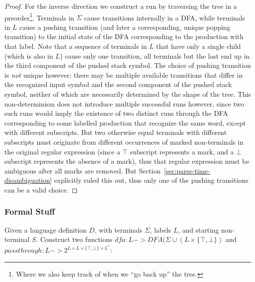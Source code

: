 \documentclass[acmsmall,review,anonymous]{acmart}\settopmatter{printfolios=true,printccs=false,printacmref=false}
\newcommand{\T}{\Sigma} %
\newcommand{\Labels}{L} %
\newcommand{\dfa}{\mathit{dfa}} %
\newcommand{\passthrough}{\mathit{passthrough}} %
\begin{document}
\begin{proof}
  For the inverse direction we construct a run by traversing the tree in a preorder\footnote{Where we also keep track of when we ``go back up'' the tree.}. Terminals in $\T$ cause transitions internally in a DFA, while terminals in $\Labels$ cause a pushing transition (and later a corresponding, unique popping transition) to the initial state of the DFA corresponding to the production with that label. Note that a sequence of terminals in $\Labels$ that have only a single child (which is also in $\Labels$) cause only one transition, all terminals but the last end up in the third component of the pushed stack symbol. The choice of pushing transition is \emph{not} unique however; there may be multiple available transitions that differ in the recognized input symbol and the second component of the pushed stack symbol, neither of which are necessarily determined by the shape of the tree. This non-determinism does not introduce multiple successful runs however, since two such runs would imply the existence of two distinct runs through the DFA corresponding to some labelled production that recognize the same word, except with different subscripts. But two otherwise equal terminals with different subscripts must originate from different occurrences of marked non-terminals in the original regular expression (since a $\top$ subscript represents a mark, and a $\bot$ subscript represents the absence of a mark), thus that regular expression must be ambiguous after all marks are removed. But Section~\ref{sec:parse-time-disambiguation} explicitly ruled this out, thus only one of the pushing transitions can be a valid choice.

\end{proof}

\subsubsection{Formal Stuff}

Given a language definition $D$, with terminals $\T$, labels $\Labels$, and starting non-terminal $S$. Construct two functions $\dfa : \Labels -> \mathit{DFA}(\T \cup (\Labels \times \{\top, \bot\})$ and $\passthrough : \Labels -> 2^{\Labels \times \Labels \times \{\top, \bot\} \times \Labels^{*}}$:
\end{document}
